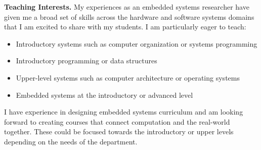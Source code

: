 \documentclass[11pt]{article} %
\begin{document}
\textbf{Teaching Interests.}
My experiences as an embedded systems researcher have given me a broad set of
skills across the hardware and software systems domains that I am excited to
share with my students. I am particularly eager to teach:
%
\begin{itemize}
  \item Introductory systems such as computer organization or systems programming
  \item Introductory programming or data structures
  \item Upper-level systems such as computer architecture or operating systems
  \item Embedded systems at the introductory or advanced level
\end{itemize}
%
I have experience in designing embedded systems curriculum and am looking
forward to creating courses that connect computation and the real-world
together. These could be focused towards the introductory or upper levels
depending on the needs of the department.


%
\end{document}
